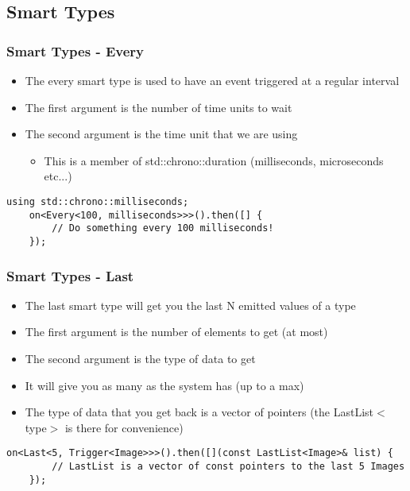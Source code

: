 \documentclass{beamer}
\begin{document}
\subsection{Smart Types}
\begin{frame}[fragile]
	\frametitle{Smart Types - Every}
	\begin{itemize}
		\item The every smart type is used to have an event triggered at a regular interval
		\item The first argument is the number of time units to wait
		\item The second argument is the time unit that we are using
		\begin{itemize}
			\item This is a member of std::chrono::duration (milliseconds, microseconds etc...)
		\end{itemize}
	\end{itemize}

	\begin{lstlisting}[language=nuclear]
	using std::chrono::milliseconds;
	on<Every<100, milliseconds>>>().then([] {
	    // Do something every 100 milliseconds!
	});
	\end{lstlisting}
\end{frame}

\begin{frame}[fragile]
	\frametitle{Smart Types - Last}
	\begin{itemize}
		\item The last smart type will get you the last N emitted values of a type
		\item The first argument is the number of elements to get (at most)
		\item The second argument is the type of data to get
		\item It will give you as many as the system has (up to a max)
		\item The type of data that you get back is a vector of pointers (the LastList$<$type$>$ is there for convenience)
	\end{itemize}

	\begin{lstlisting}[language=nuclear]
	on<Last<5, Trigger<Image>>>().then([](const LastList<Image>& list) {
	    // LastList is a vector of const pointers to the last 5 Images
	});
	\end{lstlisting}
\end{frame}
\end{document}
